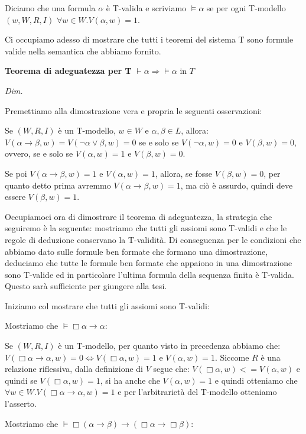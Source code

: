 \documentclass[a4paper, 12pt]{article}
\begin{document}
Diciamo che una formula $\alpha$ è T-valida e scriviamo $\vDash \alpha$
se per ogni T-modello $(w, W, R, I)$ $\forall w \in W. V(\alpha, w) = 1$.

Ci occupiamo adesso di mostrare che tutti i teoremi del sistema T sono formule valide
nella semantica che abbiamo fornito.

\begin{flushleft}
\textbf{Teorema di adeguatezza per T}
$\vdash \alpha \Rightarrow \vDash \alpha$ in $T$

\textit{Dim.}

Premettiamo alla dimostrazione vera e propria le seguenti osservazioni:

Se $(W, R, I)$ è un T-modello, $w \in W$ e $\alpha, \beta \in L$, allora:
$V(\alpha \rightarrow \beta, w) = V(\neg \alpha \lor \beta, w) = 0$ se e solo se
$V(\neg \alpha, w) = 0$ e $V(\beta, w) = 0$, ovvero, se e solo se $V(\alpha, w) = 1$ e $V(\beta, w) = 0$.

Se poi $V(\alpha \rightarrow \beta, w) = 1$ e $V(\alpha, w) = 1$, allora, se fosse
$V(\beta, w) = 0$, per quanto detto prima avremmo $V(\alpha \rightarrow \beta, w) = 1$, ma ciò
è assurdo, quindi deve essere $V(\beta, w) = 1$.

Occupiamoci ora di dimostrare il teorema di adeguatezza, la strategia che seguiremo è la seguente:
mostriamo che tutti gli assiomi sono T-validi e che le regole di deduzione conservano la T-validità.
Di conseguenza per le condizioni che abbiamo dato sulle formule ben formate che formano una dimostrazione,
deduciamo che tutte le formule ben formate che appaiono in una dimostrazione sono T-valide
ed in particolare l'ultima formula della sequenza finita è T-valida.
Questo sarà sufficiente per giungere alla tesi.

Iniziamo col mostrare che tutti gli assiomi sono T-validi:

Mostriamo che $\vDash \Box \alpha \rightarrow \alpha$:

Se $(W, R, I)$ è un T-modello, per quanto visto in precedenza abbiamo che:
$V(\Box \alpha \rightarrow \alpha, w) = 0 \Leftrightarrow V(\Box \alpha, w) = 1$ e $V(\alpha, w) = 1$.
Siccome $R$ è una relazione riflessiva, dalla definizione di $V$ segue che:
$V(\Box \alpha, w) <= V(\alpha, w)$ e quindi se $V(\Box \alpha, w) = 1$, si ha anche che
$V(\alpha, w) = 1$ e quindi otteniamo che
$\forall w \in W. V(\Box \alpha \rightarrow \alpha, w) = 1$ e per l'arbitrarietà
del T-modello otteniamo l'asserto.

Mostriamo che $\vDash \Box (\alpha \rightarrow \beta) \rightarrow (\Box \alpha \rightarrow \Box \beta)$:


\end{flushleft}
\end{document}
